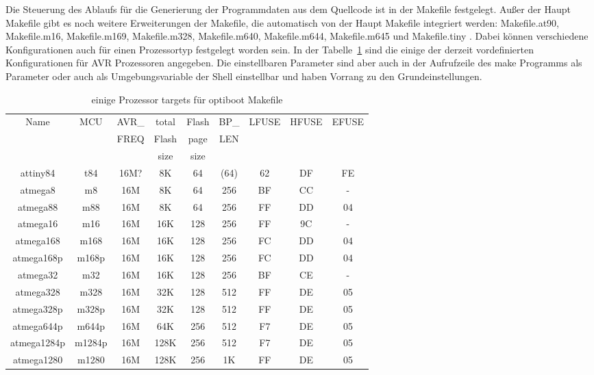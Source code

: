 Die Steuerung des Ablaufs für die Generierung der Programmdaten aus
dem Quellcode ist in der Makefile festgelegt.
Außer der  Haupt Makefile gibt es noch weitere Erweiterungen
der Makefile, die automatisch von der Haupt Makefile integriert werden:
Makefile.at90, Makefile.m16, Makefile.m169, Makefile.m328, Makefile.m640, Makefile.m644,
Makefile.m645 und Makefile.tiny .
Dabei können verschiedene Konfigurationen auch für einen Prozessortyp
festgelegt worden sein. In der Tabelle~\ref{tab:processors} sind die einige der derzeit vordefinierten
Konfigurationen für AVR Prozessoren angegeben. 
Die einstellbaren Parameter sind aber auch in der Aufrufzeile des
make Programms als Parameter oder auch als Umgebungsvariable der Shell
einstellbar und haben Vorrang zu den Grundeinstellungen.

\begin{table}[H]
  \begin{center}
    \begin{tabular}{| c | c | c | c | c | c | c | c | c |}
    \hline
             Name  & MCU & AVR\_ & total & Flash & BP\_ & LFUSE & HFUSE & EFUSE  \\
                   &     & FREQ  & Flash & page  & LEN  &       &       &        \\
                   &     &       &  size & size  &      &       &       &        \\
    \hline
    \hline
         attiny84 & t84   & 16M? &  8K   &  64   & (64) &  62   &  DF   & FE \\
    \hline
         atmega8  & m8    & 16M  &  8K   &  64   & 256  &  BF   &  CC   &  - \\
    \hline
         atmega88 & m88   & 16M  &  8K   &  64   & 256  &  FF   &  DD   &  04 \\
    \hline
       atmega16   & m16   & 16M  &  16K  & 128   & 256  &  FF   &  9C   &  - \\
    \hline
       atmega168  &  m168  & 16M  &  16K & 128   & 256  &  FC   &  DD   &  04 \\
       atmega168p &  m168p & 16M  &  16K & 128   & 256  &  FC   &  DD   &  04 \\
    \hline
       atmega32   &  m32   & 16M  &  16K & 128   & 256  &  BF   &  CE   &  - \\
    \hline
       atmega328  &  m328  & 16M  &  32K & 128   & 512  &  FF   &  DE   &  05 \\
       atmega328p & m328p & 16M  &  32K  & 128   & 512  &  FF   &  DE   &  05 \\
    \hline
       atmega644p & m644p & 16M  &  64K  & 256   & 512  &  F7   &  DE   &  05 \\
    \hline
     atmega1284p & m1284p & 16M  & 128K  & 256   & 512  &  F7   &  DE   &  05 \\
    \hline
     atmega1280  & m1280  & 16M  &  128K & 256   & 1K   &  FF   &  DE   &  05 \\
    \hline
    \end{tabular}
  \end{center}
  \caption{einige Prozessor targets für optiboot Makefile}
  \label{tab:processors}
\end{table}

